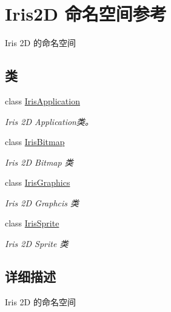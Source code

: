 \hypertarget{namespace_iris2_d}{}\section{Iris2D 命名空间参考}
\label{namespace_iris2_d}


Iris 2D 的命名空间  


\subsection*{类}
\begin{DoxyCompactItemize}
\item 
class \hyperlink{class_iris2_d_1_1_iris_application}{Iris\+Application}
\begin{DoxyCompactList}\small\item\em Iris 2D Application类。 \end{DoxyCompactList}\item 
class \hyperlink{class_iris2_d_1_1_iris_bitmap}{Iris\+Bitmap}
\begin{DoxyCompactList}\small\item\em Iris 2D Bitmap 类 \end{DoxyCompactList}\item 
class \hyperlink{class_iris2_d_1_1_iris_graphics}{Iris\+Graphics}
\begin{DoxyCompactList}\small\item\em Iris 2D Graphcis 类 \end{DoxyCompactList}\item 
class \hyperlink{class_iris2_d_1_1_iris_sprite}{Iris\+Sprite}
\begin{DoxyCompactList}\small\item\em Iris 2D Sprite 类 \end{DoxyCompactList}\end{DoxyCompactItemize}


\subsection{详细描述}
Iris 2D 的命名空间 